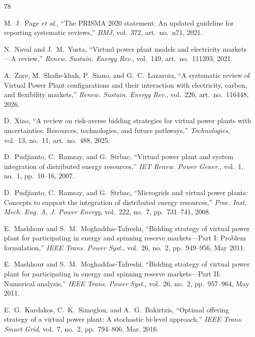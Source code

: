 \documentclass[journal]{IEEEtran}
\begin{document}
\begin{thebibliography}{78}

 M.~J.~Page \textit{et al.}, ``The PRISMA 2020 statement: An updated guideline for reporting systematic reviews,'' \textit{BMJ}, vol.~372, art.~no.~n71, 2021.

 N.~Naval and J.~M.~Yusta, ``Virtual power plant models and electricity markets---A review,'' \textit{Renew. Sustain. Energy Rev.}, vol.~149, art.~no.~111393, 2021.

 A.~Zare, M.~Shafie-khah, P.~Siano, and G.~C.~Lazaroiu, ``A systematic review of Virtual Power Plant configurations and their interaction with electricity, carbon, and flexibility markets,'' \textit{Renew. Sustain. Energy Rev.}, vol.~226, art.~no.~116448, 2026.

 D.~Xiao, ``A review on risk-averse bidding strategies for virtual power plants with uncertainties: Resources, technologies, and future pathways,'' \textit{Technologies}, vol.~13, no.~11, art.~no.~488, 2025.

 D.~Pudjianto, C.~Ramsay, and G.~Strbac, ``Virtual power plant and system integration of distributed energy resources,'' \textit{IET Renew. Power Gener.}, vol.~1, no.~1, pp.~10--16, 2007.

 D.~Pudjianto, C.~Ramsay, and G.~Strbac, ``Microgrids and virtual power plants: Concepts to support the integration of distributed energy resources,'' \textit{Proc. Inst. Mech. Eng. A, J. Power Energy}, vol.~222, no.~7, pp.~731--741, 2008.

 E.~Mashhour and S.~M.~Moghaddas-Tafreshi, ``Bidding strategy of virtual power plant for participating in energy and spinning reserve markets---Part I: Problem formulation,'' \textit{IEEE Trans. Power Syst.}, vol.~26, no.~2, pp.~949--956, May 2011.

 E.~Mashhour and S.~M.~Moghaddas-Tafreshi, ``Bidding strategy of virtual power plant for participating in energy and spinning reserve markets---Part II: Numerical analysis,'' \textit{IEEE Trans. Power Syst.}, vol.~26, no.~2, pp.~957--964, May 2011.

 E.~G.~Kardakos, C.~K.~Simoglou, and A.~G.~Bakirtzis, ``Optimal offering strategy of a virtual power plant: A stochastic bi-level approach,'' \textit{IEEE Trans. Smart Grid}, vol.~7, no.~2, pp.~794--806, Mar. 2016.


\end{thebibliography}
\end{document}
